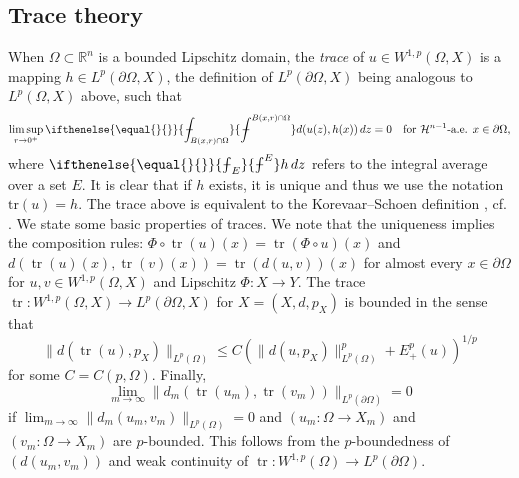 \documentclass[a4paper,leqno]{amsart}
\numberwithin{equation}{section}
\theoremstyle{remark}
\theoremstyle{remark}
\DeclareMathOperator{\trace}{tr}
\newcommand{\aint}[2][]{%
	\ifthenelse{\equal{#1}{}}%
					{%
\mathchoice%
      {\mathop{\kern 0.2em\vrule width 0.6em height 0.69678ex depth -0.58065ex
              \kern -0.8em \intop}\nolimits_{\kern -0.45em#2}^{#1}}%
      {\mathop{\kern 0.1em\vrule width 0.5em height 0.69678ex depth -0.60387ex
              \kern -0.6em \intop}\nolimits_{#2}^{#1}}%
      {\mathop{\kern 0.1em\vrule width 0.5em height 0.69678ex depth -0.60387ex
              \kern -0.6em \intop}\nolimits_{#2}^{#1}}%
      {\mathop{\kern 0.1em\vrule width 0.5em height 0.69678ex depth -0.60387ex
              \kern -0.6em \intop}\nolimits_{#2}^{#1}}}%
					{%
\mathchoice%
      {\mathop{\kern 0.2em\vrule width 0.6em height 0.69678ex depth -0.58065ex
              \kern -0.8em \intop}\nolimits_{\kern -0.45em#1}^{#2}}%
      {\mathop{\kern 0.1em\vrule width 0.5em height 0.69678ex depth -0.60387ex
              \kern -0.6em \intop}\nolimits_{#1}^{#2}}%
      {\mathop{\kern 0.1em\vrule width 0.5em height 0.69678ex depth -0.60387ex
              \kern -0.6em \intop}\nolimits_{#1}^{#2}}%
      {\mathop{\kern 0.1em\vrule width 0.5em height 0.69678ex depth -0.60387ex
              \kern -0.6em \intop}\nolimits_{#1}^{#2}}}}
\begin{document}
\subsection{Trace theory}\label{section-trace-theory}
When $\Omega \subset \mathbb{R}^n$ is a bounded Lipschitz domain, the \emph{trace} of $u \in W^{1,p}( \Omega, X )$ is a mapping $h \in L^{p}( \partial \Omega, X )$, the definition of $L^{p}( \partial \Omega, X )$ being analogous to $L^{p}( \Omega, X )$ above, such that
\begin{equation*}
    \limsup_{ r \rightarrow 0^+ }
    \aint{ B(x,r) \cap \Omega } d( u(z), h(x) ) \,dz
    =
    0
    \quad\text{for $\mathcal{H}^{n-1}$-a.e. $x \in \partial \Omega$,}
\end{equation*}
where $\aint{ E } h \,dz$ refers to the integral average over a set $E$. It is clear that if $h$ exists, it is unique and thus we use the notation $\mathrm{tr}(u) = h$. The trace above is equivalent to the Korevaar--Schoen definition \cite[Section 1.12]{Kor:Sch:93}, cf. \cite[Section 3]{guo-huang-wang-xu-2022-p-harmonic-mappings-between-metric-spaces}. We state some basic properties of traces. We note that the uniqueness implies the composition rules: $\Phi \circ \trace(u)(x) = \trace( \Phi \circ u )(x)$ and $d( \trace(u)(x), \trace(v)(x) ) = \trace( d(u,v) )(x)$ for almost every $x \in \partial \Omega$ for $u,v \in W^{1,p}( \Omega, X )$ and Lipschitz $\Phi \colon X \to Y$. The trace $\trace \colon W^{1,p}( \Omega, X ) \to L^{p}( \partial \Omega, X )$ for $X = ( X, d, p_X )$ is bounded in the sense that
\begin{equation*}
    \| d( \trace(u), p_X ) \|_{ L^{p}(\Omega) } \leq C\left( \| d( u, p_X ) \|_{L^{p}(\Omega)}^{p} + E_{+}^{p}(u) \right)^{1/p} 
\end{equation*}
for some $C = C(p, \Omega)$. Finally,
\begin{equation*}
    \lim_{m\to\infty}\| d_m( \trace(u_m), \trace(v_m) ) \|_{ L^{p}(\partial \Omega) } = 0
\end{equation*}
if $\lim_{m \to \infty} \| d_m( u_m, v_m ) \|_{ L^{p}(\Omega) } = 0$ and $( u_m \colon \Omega \to X_m )$ and $( v_m \colon \Omega \to X_m )$ are $p$-bounded. This follows from the $p$-boundedness of $( d(u_m,v_m) )$ and weak continuity of $\trace\colon W^{1,p}(\Omega) \to L^{p}( \partial \Omega )$.
\end{document}
